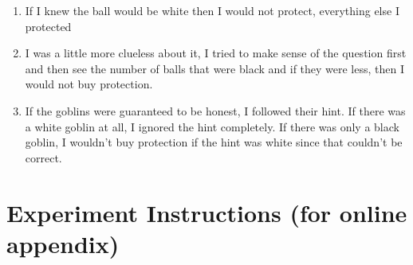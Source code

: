 \documentclass[12pt,a4paper]{article}
\begin{document}
\begin{enumerate}
\item If I knew the ball would be white then I would not protect, everything else I protected

\item I was a little more clueless about it, I tried to make sense of the question first and then see the number of balls that were black and if they were less, then I would not buy protection.

\item If the goblins were guaranteed to be honest, I followed their hint. If there was a white goblin at all, I ignored the hint completely. If there was only a black goblin, I wouldn't buy protection if the hint was white since that couldn't be correct.


\end{enumerate}

\newpage
\section{Experiment Instructions (for online appendix)}



\renewcommand{\contentsname}{\vspace{-1em}}

\setcounter{table}{0}
\setcounter{figure}{0}
\setcounter{equation}{0}
\setcounter{footnote}{0}
\setcounter{section}{0}
\renewcommand\thesection{\Alph{section}}
\renewcommand\theequation{\thesection.\arabic{equation}}
\renewcommand\thetable{\thesection.\arabic{table}}
\renewcommand\thefigure{\thesection.\arabic{figure}}
\renewcommand\thesubsection{\Roman{subsection}}
\end{document}

